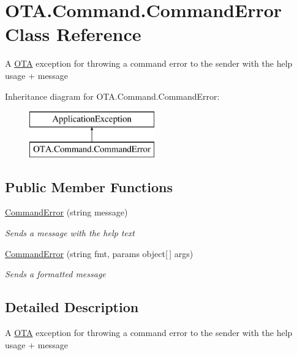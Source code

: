 \hypertarget{class_o_t_a_1_1_command_1_1_command_error}{}\section{O\+T\+A.\+Command.\+Command\+Error Class Reference}
\label{class_o_t_a_1_1_command_1_1_command_error}


A \hyperlink{namespace_o_t_a}{O\+T\+A} exception for throwing a command error to the sender with the help usage + message  


Inheritance diagram for O\+T\+A.\+Command.\+Command\+Error\+:\begin{figure}[H]
\begin{center}
\leavevmode
\includegraphics[height=2.000000cm]{class_o_t_a_1_1_command_1_1_command_error}
\end{center}
\end{figure}
\subsection*{Public Member Functions}
\begin{DoxyCompactItemize}
\item 
\hyperlink{class_o_t_a_1_1_command_1_1_command_error_ab5b37764f798a01e81125e46394ea2c2}{Command\+Error} (string message)
\begin{DoxyCompactList}\small\item\em Sends a message with the help text \end{DoxyCompactList}\item 
\hyperlink{class_o_t_a_1_1_command_1_1_command_error_adbc69baed1983fec6790453f431a89e2}{Command\+Error} (string fmt, params object\mbox{[}$\,$\mbox{]} args)
\begin{DoxyCompactList}\small\item\em Sends a formatted message \end{DoxyCompactList}\end{DoxyCompactItemize}


\subsection{Detailed Description}
A \hyperlink{namespace_o_t_a}{O\+T\+A} exception for throwing a command error to the sender with the help usage + message 



